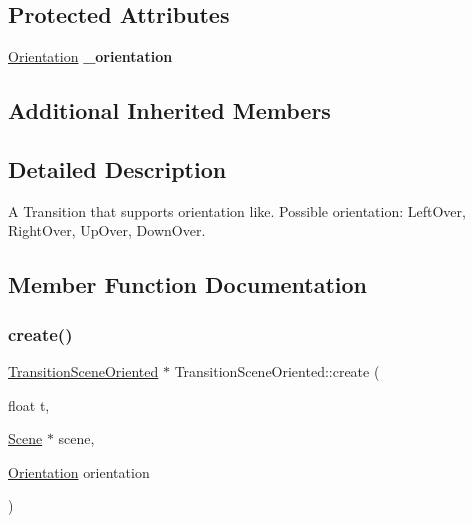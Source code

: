 \subsection*{Protected Attributes}
\begin{DoxyCompactItemize}
\item 
\mbox{\label{classTransitionSceneOriented_aa78da4327eaa5dcb7615d8cdd6a47e2c}} 
\hyperlink{classTransitionScene_a0b2b247806fb10a20de0cbc554210c4d}{Orientation} {\bfseries \+\_\+orientation}
\end{DoxyCompactItemize}
\subsection*{Additional Inherited Members}


\subsection{Detailed Description}
A Transition that supports orientation like. Possible orientation\+: Left\+Over, Right\+Over, Up\+Over, Down\+Over. 

\subsection{Member Function Documentation}
\mbox{\label{classTransitionSceneOriented_a800e9cc8447860aeff0f9b9d198f4f29}} 
\subsubsection{\texorpdfstring{create()}{create()}\hspace{0.1cm}{\footnotesize\ttfamily [1/2]}}
{\footnotesize\ttfamily \hyperlink{classTransitionSceneOriented}{Transition\+Scene\+Oriented} $\ast$ Transition\+Scene\+Oriented\+::create (\begin{DoxyParamCaption}\item[{float}]{t,  }\item[{\hyperlink{classScene}{Scene} $\ast$}]{scene,  }\item[{\hyperlink{classTransitionScene_a0b2b247806fb10a20de0cbc554210c4d}{Orientation}}]{orientation }\end{DoxyParamCaption})\hspace{0.3cm}{\ttfamily [static]}}

